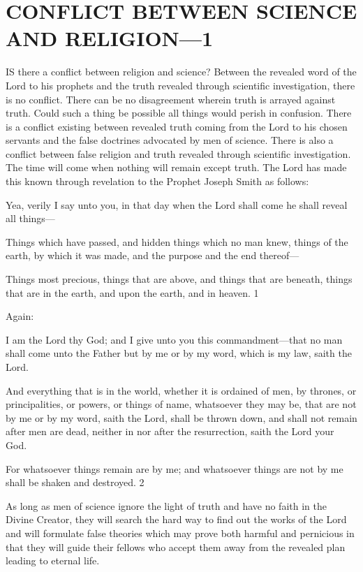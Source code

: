 \chapter{CONFLICT BETWEEN SCIENCE AND RELIGION—1}

IS there a conflict between religion and science? Between the revealed word of the Lord to
his prophets and the truth revealed through scientific investigation, there is no conflict. There
can be no disagreement wherein truth is arrayed against truth. Could such a thing be possible
all things would perish in confusion. There is a conflict existing between revealed truth
coming from the Lord to his chosen servants and the false doctrines advocated by men of
science. There is also a conflict between false religion and truth revealed through scientific
investigation. The time will come when nothing will remain except truth. The Lord has made
this known through revelation to the Prophet Joseph Smith as follows:

Yea, verily I say unto you, in that day when the Lord shall come he shall reveal all things—

Things which have passed, and hidden things which no man knew, things of the earth, by
which it was made, and the purpose and the end thereof—

Things most precious, things that are above, and things that are beneath, things that are in the
earth, and upon the earth, and in heaven. 1

Again:

I am the Lord thy God; and I give unto you this commandment—that no man shall come unto
the Father but by me or by my word, which is my law, saith the Lord.

And everything that is in the world, whether it is ordained of men, by thrones, or
principalities, or powers, or things of name, whatsoever they may be, that are not by me or by
my word, saith the Lord, shall be thrown down, and shall not remain after men are dead,
neither in nor after the resurrection, saith the Lord your God.

For whatsoever things remain are by me; and whatsoever things are not by me shall be
shaken and destroyed. 2

As long as men of science ignore the light of truth and have no faith in the Divine Creator,
they will search the hard way to find out the works of the Lord and will formulate false
theories which may prove both harmful and pernicious in that they will guide their fellows
who accept them away from the revealed plan leading to eternal life.

